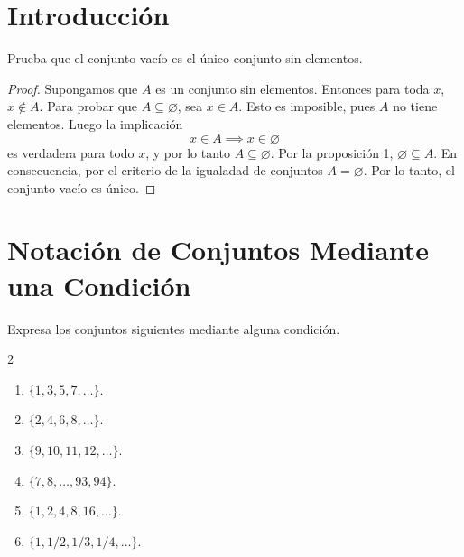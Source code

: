 \documentclass[12pt,a4paper]{book}
\begin{document}
    \section{Introducción}

    \begin{ejercicio}
        Prueba que el conjunto vacío es el único conjunto sin elementos.
    \end{ejercicio}

    \begin{proof}
        Supongamos que $A$ es un conjunto sin elementos. Entonces para toda $x$, $x\notin A$.
        Para probar que $A\subseteq\varnothing$, sea $x\in A$. Esto es imposible, pues $A$ no tiene
        elementos. Luego la implicación
        \begin{equation*}
            x\in A\implies x\in\varnothing
        \end{equation*}
        es verdadera para todo $x$, y por lo tanto $A\subseteq\varnothing$. Por la proposición 1,
        $\varnothing\subseteq A$. En consecuencia, por el criterio de la igualadad de conjuntos $A=\varnothing$.
        Por lo tanto, el conjunto vacío es único.
    \end{proof}

    \section{Notación de Conjuntos Mediante una Condición}

    \begin{ejercicio}
        Expresa los conjuntos siguientes mediante alguna condición.
        \begin{multicols}{2}
            \begin{enumerate}
                \item[(a)] $\{1,3,5,7,\dots\}$.
                \item[(b)] $\{2,4,6,8,\dots\}$.
                \item[(c)] $\{9,10,11,12,\dots\}$.
                \item[(d)] $\{7,8,\dots,93,94\}$.
                \item[(e)] $\{1,2,4,8,16,\dots\}$.
                \item[(f)] $\{1,1/2,1/3,1/4,\dots\}$.   
            \end{enumerate}
        \end{multicols}
    \end{ejercicio}
\end{document}
